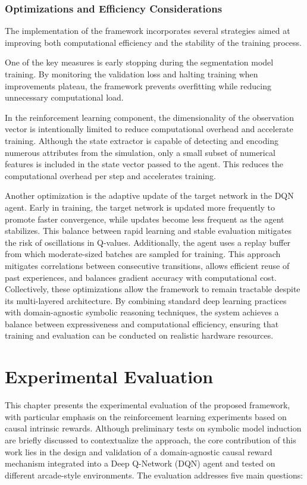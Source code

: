 \documentclass[12pt,a4paper]{report}
\begin{document}
\subsection{Optimizations and Efficiency Considerations}
The implementation of the framework incorporates several strategies aimed at improving both computational efficiency and the stability of the training process. 

One of the key measures is early stopping during the segmentation model training. By monitoring the validation loss and halting training when improvements plateau, the framework prevents overfitting while reducing unnecessary computational load. 

In the reinforcement learning component, the dimensionality of the observation vector is intentionally limited to reduce computational overhead and accelerate training. Although the state extractor is capable of detecting and encoding numerous attributes from the simulation, only a small subset of numerical features is included in the state vector passed to the agent. This reduces the computational overhead per step and accelerates training.

Another optimization is the adaptive update of the target network in the DQN agent. Early in training, the target network is updated more frequently to promote faster convergence, while updates become less frequent as the agent stabilizes. This balance between rapid learning and stable evaluation mitigates the risk of oscillations in Q-values.
Additionally, the agent uses a replay buffer from which moderate-sized batches are sampled for training. This approach mitigates correlations between consecutive transitions, allows efficient reuse of past experiences, and balances gradient accuracy with computational cost.
Collectively, these optimizations allow the framework to remain tractable despite its multi-layered architecture. By combining standard deep learning practices with domain-agnostic symbolic reasoning techniques, the system achieves a balance between expressiveness and computational efficiency, ensuring that training and evaluation can be conducted on realistic hardware resources.


\chapter{Experimental Evaluation}

This chapter presents the experimental evaluation of the proposed framework, with particular emphasis on the reinforcement learning experiments based on causal intrinsic rewards. Although preliminary tests on symbolic model induction are briefly discussed to contextualize the approach, the core contribution of this work lies in the design and validation of a domain-agnostic causal reward mechanism integrated into a Deep Q-Network (DQN) agent and tested on different arcade-style environments.
The evaluation addresses five main questions:
\end{document}
